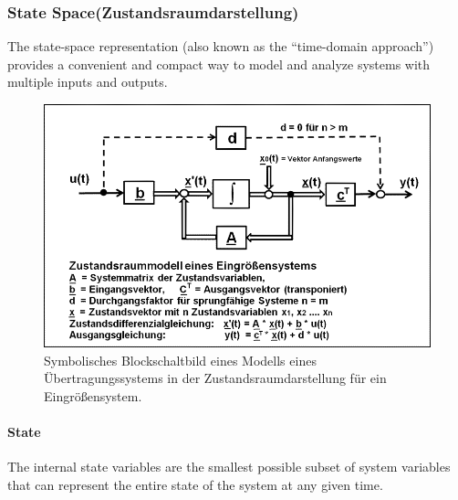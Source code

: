 %
%

\subsubsection{State Space(Zustandsraumdarstellung)}
The state-space representation (also known as the ``time-domain approach'') provides a convenient and compact way to model and analyze systems with multiple inputs and outputs.

\begin{figure}
  \centering
  \includegraphics[width=4.5in]{fig/Zustandsraummodell_eines_eingroessensystems.png}
  \caption{Symbolisches Blockschaltbild eines Modells eines Übertragungssystems in der Zustandsraumdarstellung für ein Eingrößensystem.}\label{fig_Zustandraumdarstellung}
\end{figure}

\paragraph{State} The internal state variables are the smallest possible subset of system variables that can represent the entire state of the system at any given time.

